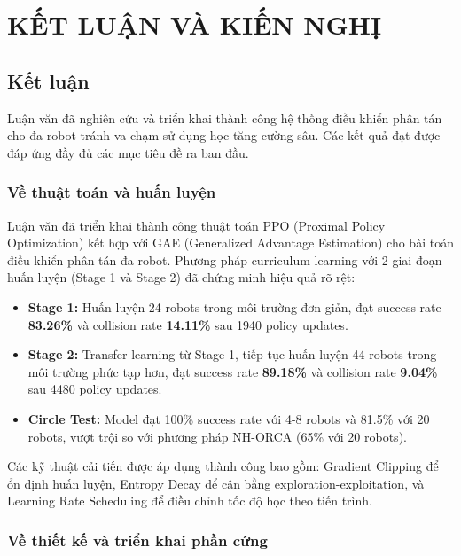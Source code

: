 
\chapter{KẾT LUẬN VÀ KIẾN NGHỊ}
\label{chap:conclusion}

\section{Kết luận}
\label{sec:conclusion}

Luận văn đã nghiên cứu và triển khai thành công hệ thống điều khiển phân tán cho đa robot tránh va chạm sử dụng học tăng cường sâu. Các kết quả đạt được đáp ứng đầy đủ các mục tiêu đề ra ban đầu.

\subsection{Về thuật toán và huấn luyện}

Luận văn đã triển khai thành công thuật toán PPO (Proximal Policy Optimization) kết hợp với GAE (Generalized Advantage Estimation) cho bài toán điều khiển phân tán đa robot. Phương pháp curriculum learning với 2 giai đoạn huấn luyện (Stage 1 và Stage 2) đã chứng minh hiệu quả rõ rệt:

\begin{itemize}[nosep]
\item \textbf{Stage 1:} Huấn luyện 24 robots trong môi trường đơn giản, đạt success rate \textbf{83.26\%} và collision rate \textbf{14.11\%} sau 1940 policy updates.
\item \textbf{Stage 2:} Transfer learning từ Stage 1, tiếp tục huấn luyện 44 robots trong môi trường phức tạp hơn, đạt success rate \textbf{89.18\%} và collision rate \textbf{9.04\%} sau 4480 policy updates.
\item \textbf{Circle Test:} Model đạt 100\% success rate với 4-8 robots và 81.5\% với 20 robots, vượt trội so với phương pháp NH-ORCA (65\% với 20 robots).
\end{itemize}

Các kỹ thuật cải tiến được áp dụng thành công bao gồm: Gradient Clipping để ổn định huấn luyện, Entropy Decay để cân bằng exploration-exploitation, và Learning Rate Scheduling để điều chỉnh tốc độ học theo tiến trình.

\subsection{Về thiết kế và triển khai phần cứng}


